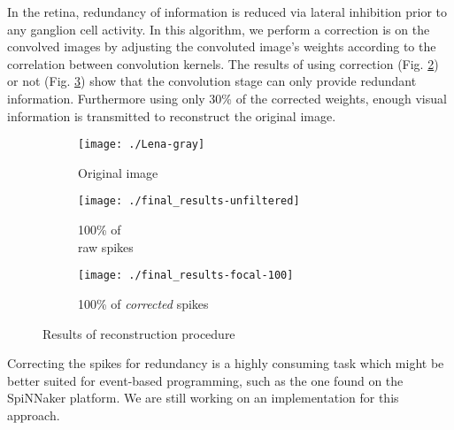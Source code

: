 In the retina, redundancy of information is reduced via lateral inhibition 
prior to any ganglion cell activity. In this algorithm, we perform a correction 
is on the convolved images by adjusting the convoluted image's weights 
according to the correlation between convolution kernels. The results of using
correction (Fig. \ref{pic-unfiltered-spikes}) or not (Fig. 
\ref{pic-100pc-spikes}) show that the convolution stage can only provide 
redundant information. Furthermore using only 30\% of the corrected weights, 
enough visual information is transmitted\cite{basab-model} to reconstruct the
original image.

\begin{figure}[hbt]
  \centering
  \begin{subfigure}[t]{0.15\textwidth}
    \centering
    \captionsetup{justification=centering,margin=0.1cm}
    \texttt{[image: ./Lena-gray]}
    \caption{Original image}
    \label{pic-original-lena}
  \end{subfigure}
  \begin{subfigure}[t]{0.15\textwidth}
    \centering
    \captionsetup{justification=centering,margin=0.1cm}
    \texttt{[image: ./final\_results-unfiltered]}
    \caption{100\% of \\raw spikes}
    \label{pic-unfiltered-spikes}
  \end{subfigure}
  \begin{subfigure}[t]{0.15\textwidth}
    \centering
    \captionsetup{justification=centering,margin=0.1cm}
    \texttt{[image: ./final\_results-focal-100]}
    \caption{100\% of \emph{corrected} spikes}
    \label{pic-100pc-spikes}
  \end{subfigure}
  \caption{Results of reconstruction procedure}
  \label{fig-reconstruction}
\end{figure}
Correcting the spikes for redundancy is a highly consuming task which might be 
better suited for event-based programming, such as the one found on the 
SpiNNaker platform. We are still working on an implementation for this 
approach.

